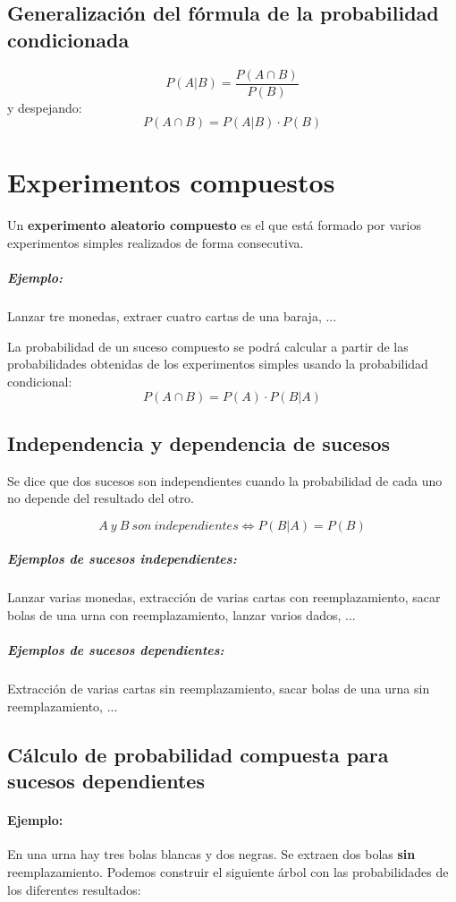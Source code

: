 \documentclass[a4paper,spanish,9pt]{extarticle}
\begin{document}
\begin{multicols*}{2}
\subsection{Generalización del fórmula de la probabilidad condicionada} $$P(A|B)=\dfrac{P(A\cap B)}{P(B)}$$
y despejando:
$$P(A\cap B) = P(A|B)\cdot P(B)$$

\section{Experimentos compuestos} Un \textbf{experimento aleatorio compuesto} es el que está formado por varios experimentos simples realizados de forma consecutiva.
\subparagraph{Ejemplo:}Lanzar tre monedas, extraer cuatro cartas de una baraja, ...

La probabilidad de un suceso compuesto se podrá calcular a partir de las probabilidades obtenidas de los experimentos simples usando la probabilidad condicional:
$$P(A\cap B) = P(A) \cdot P(B|A)$$

\subsection{Independencia y dependencia de sucesos}
Se dice que dos sucesos son independientes cuando la probabilidad de cada uno no depende del resultado del otro. 

$$A\ y \ B\ son \ independientes \Longleftrightarrow P(B|A)=P(B)$$

\subparagraph{Ejemplos de sucesos independientes:}  Lanzar varias monedas, extracción de varias cartas con reemplazamiento, sacar bolas de una urna con reemplazamiento, lanzar varios dados, ...
\subparagraph{Ejemplos de sucesos dependientes:}  Extracción de varias cartas sin reemplazamiento, sacar bolas de una urna sin reemplazamiento, ...

\subsection{Cálculo de probabilidad compuesta para sucesos dependientes}
\paragraph{Ejemplo:} En una urna hay tres bolas blancas y dos negras. Se extraen dos bolas \textbf{sin} reemplazamiento. Podemos construir el siguiente árbol con las probabilidades de los diferentes resultados:


\end{multicols*}
\end{document}
